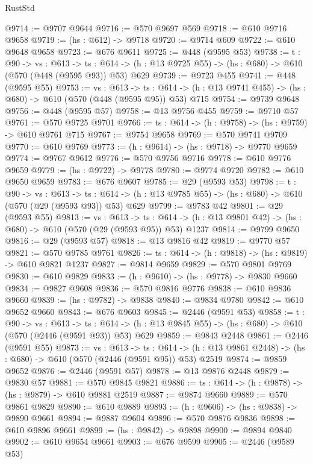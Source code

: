 \begin{lexlean}{RustStd}
\begin{coremodule}
@9714 := @9707 @9644
@9716 := @570 @9697 @569
@9718 := @610 @9716 @9658
@9719 := (hs : @612) -> @9718
@9720 := @9714 @609
@9722 := @610 @9648 @9658
@9723 := @676 @9611
@9725 := @448 (@9595 @53)
@9738 := {t : @90} ->
  {vs : @613} ->
  {ts : @614} -> (h : @13 @9725 @55) -> (hs : @680) -> @610 (@570 (@448 (@9595 @93)) @53) @629
@9739 := @9723 @455
@9741 := @448 (@9595 @55)
@9753 := {vs : @613} ->
  {ts : @614} -> (h : @13 @9741 @455) -> (hs : @680) -> @610 (@570 (@448 (@9595 @95)) @53) @715
@9754 := @9739 @9648
@9756 := @448 (@9595 @57)
@9758 := @13 @9756 @455
@9759 := @9710 @57
@9761 := @570 @9725 @9701
@9766 := {ts : @614} -> (h : @9758) -> (hs : @9759) -> @610 @9761 @715
@9767 := @9754 @9658
@9769 := @570 @9741 @9709
@9770 := @610 @9769
@9773 := (h : @9614) -> (hs : @9718) -> @9770 @9659
@9774 := @9767 @9612
@9776 := @570 @9756 @9716
@9778 := @610 @9776 @9659
@9779 := (hs : @9722) -> @9778
@9780 := @9774 @9720
@9782 := @610 @9650 @9659
@9783 := @676 @9607
@9785 := @29 (@9593 @53)
@9798 := {t : @90} ->
  {vs : @613} ->
  {ts : @614} -> (h : @13 @9785 @55) -> (hs : @680) -> @610 (@570 (@29 (@9593 @93)) @53) @629
@9799 := @9783 @42
@9801 := @29 (@9593 @55)
@9813 := {vs : @613} ->
  {ts : @614} -> (h : @13 @9801 @42) -> (hs : @680) -> @610 (@570 (@29 (@9593 @95)) @53) @1237
@9814 := @9799 @9650
@9816 := @29 (@9593 @57)
@9818 := @13 @9816 @42
@9819 := @9770 @57
@9821 := @570 @9785 @9761
@9826 := {ts : @614} -> (h : @9818) -> (hs : @9819) -> @610 @9821 @1237
@9827 := @9814 @9659
@9829 := @570 @9801 @9769
@9830 := @610 @9829
@9833 := (h : @9610) -> (hs : @9778) -> @9830 @9660
@9834 := @9827 @9608
@9836 := @570 @9816 @9776
@9838 := @610 @9836 @9660
@9839 := (hs : @9782) -> @9838
@9840 := @9834 @9780
@9842 := @610 @9652 @9660
@9843 := @676 @9603
@9845 := @2446 (@9591 @53)
@9858 := {t : @90} ->
  {vs : @613} ->
  {ts : @614} -> (h : @13 @9845 @55) -> (hs : @680) -> @610 (@570 (@2446 (@9591 @93)) @53) @629
@9859 := @9843 @2448
@9861 := @2446 (@9591 @55)
@9873 := {vs : @613} ->
  {ts : @614} -> (h : @13 @9861 @2448) -> (hs : @680) -> @610 (@570 (@2446 (@9591 @95)) @53) @2519
@9874 := @9859 @9652
@9876 := @2446 (@9591 @57)
@9878 := @13 @9876 @2448
@9879 := @9830 @57
@9881 := @570 @9845 @9821
@9886 := {ts : @614} -> (h : @9878) -> (hs : @9879) -> @610 @9881 @2519
@9887 := @9874 @9660
@9889 := @570 @9861 @9829
@9890 := @610 @9889
@9893 := (h : @9606) -> (hs : @9838) -> @9890 @9661
@9894 := @9887 @9604
@9896 := @570 @9876 @9836
@9898 := @610 @9896 @9661
@9899 := (hs : @9842) -> @9898
@9900 := @9894 @9840
@9902 := @610 @9654 @9661
@9903 := @676 @9599
@9905 := @2446 (@9589 @53)

\end{coremodule}
\end{lexlean}
